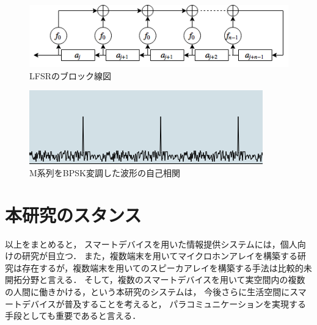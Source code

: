 \begin{figure}[p]\centering
\includegraphics[clip,width=0.9\hsize]{img/M-sequence.png}
\caption{LFSRのブロック線図}\label{fig:LFSR}
\end{figure}


\begin{figure}[p]\centering
\includegraphics[clip,width=0.9\hsize]{img/mseq_autocorrel.png}
\caption{M系列をBPSK変調した波形の自己相関}\label{fig:mseqautocorrel}
\end{figure}


\section{本研究のスタンス}

以上をまとめると，
スマートデバイスを用いた情報提供システムには，個人向けの研究が目立つ．
また，複数端末を用いてマイクロホンアレイを構築する研究は存在するが，複数端末を用いてのスピーカアレイを構築する手法は比較的未開拓分野と言える．
そして，複数のスマートデバイスを用いて実空間内の複数の人間に働きかける，という本研究のシステムは，
今後さらに生活空間にスマートデバイスが普及することを考えると，
パラコミュニケーションを実現する手段としても重要であると言える．


